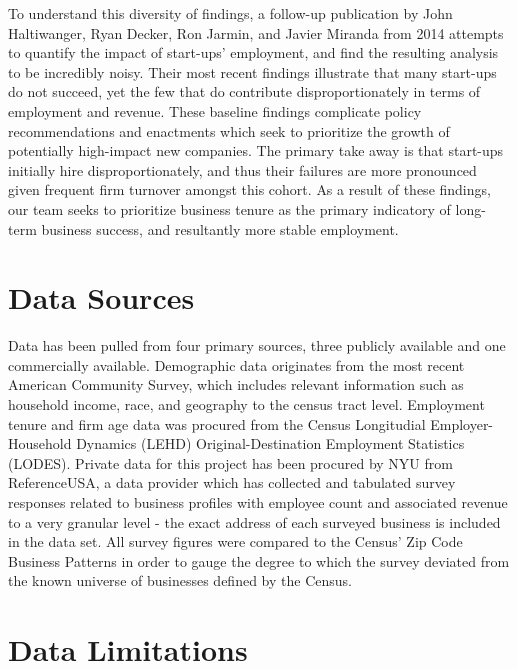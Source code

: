 \documentclass[article, 11pt]{article} %
\begin{document}
To understand this diversity of findings, a follow-up publication by John Haltiwanger, Ryan Decker, Ron Jarmin, and Javier Miranda from 2014 attempts to quantify the impact of start-ups' employment, and find the resulting analysis to be incredibly noisy. Their most recent findings illustrate that many start-ups do not succeed, yet the few that do contribute disproportionately in terms of employment and revenue. These baseline findings complicate policy recommendations and enactments which seek to prioritize the growth of potentially high-impact new companies. The primary take away is that start-ups initially hire disproportionately, and thus their failures are more pronounced given frequent firm turnover amongst this cohort. \cite{Decker} As a result of these findings, our team seeks to prioritize business tenure as the primary indicatory of long-term business success, and resultantly more stable employment.


\section*{Data Sources}

Data has been pulled from four primary sources, three publicly available and one commercially available. Demographic data originates from the most recent American Community Survey, which includes relevant information such as household income, race, and geography to the census tract level. Employment tenure and firm age data was procured from the Census Longitudial Employer-Household Dynamics (LEHD) Original-Destination Employment Statistics (LODES). Private data for this project has been procured by NYU from ReferenceUSA, a data provider which has collected and tabulated survey responses related to business profiles with employee count and associated revenue to a very granular level - the exact address of each surveyed business is included in the data set. All survey figures were compared to the Census' Zip Code Business Patterns in order to gauge the degree to which the survey deviated from the known universe of businesses defined by the Census.


\section*{Data Limitations}
\end{document}
